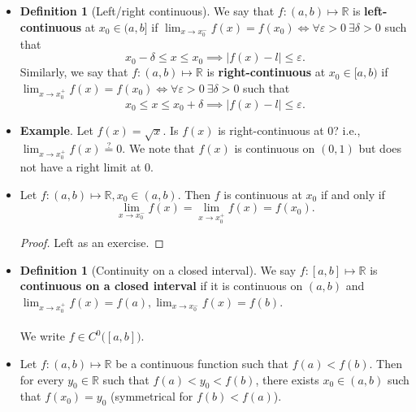 \documentclass{article}
\newcommand{\R}{\mathbb{R}}
\newcommand{\?}{\stackrel{?}{=}}
\theoremstyle{definition} %
\newtheorem{definition}[theorem]{Definition} %
\begin{document}
\begin{itemize}
\begin{definition}[Left/right limits]
              We write $\lim_{x \to x_0^+} f(x) = x_0$.
          \end{definition}
    \item[]
          \begin{definition}[Left/right continuous]
              We say that $f: (a, b) \mapsto \R$ is \textbf{left-continuous} at $x_0 \in (a, b]$ if $\lim_{x \to x_0^-} f(x) = f(x_0) \iff \forall \varepsilon > 0 \ \exists \delta > 0$ such that
              $$x_0 - \delta \leq x \leq x_0 \implies |f(x) - l| \leq \varepsilon.$$
              Similarly, we say that $f: (a, b) \mapsto \R$ is \textbf{right-continuous} at $x_0 \in [a, b)$ if $\lim_{x \to x_0^+} f(x) = f(x_0) \iff \forall \varepsilon > 0 \ \exists \delta > 0$ such that
              $$x_0 \leq x \leq x_0 + \delta \implies |f(x) - l| \leq \varepsilon.$$
          \end{definition}
    \item \textbf{Example}. Let $f(x) = \sqrt{x}$. Is $f(x)$ is right-continuous at 0? i.e., $\lim_{x \to x_0^+} f(x) \overset{?}{=} 0$. We note that $f(x)$ is continuous on $(0, 1)$ but does not have a right limit at 0.
    \item[]
          \begin{lemma}
              Let $f: (a, b) \mapsto \R, x_0 \in (a, b)$. Then $f$ is continuous at $x_0$ if and only if
              $$\lim_{x \to x_0^-} f(x) = \lim_{x \to x_0^+} f(x) = f(x_0).$$
          \end{lemma}
          \begin{proof}
              Left as an exercise.
          \end{proof}
    \item[]
          \begin{definition}[Continuity on a closed interval]
              We say $f: [a, b] \mapsto \R$ is \textbf{continuous on a closed interval} if it is continuous on $(a, b)$ and $\lim_{x \to x_0^+} f(x) = f(a), \lim_{x \to x_0^-} f(x) = f(b)$. \\\\
              We write $f \in C^0\big([a, b]\big)$.
          \end{definition}
    \item[]
          \begin{theorem}
              Let $f: (a, b) \mapsto \R$ be a continuous function such that $f(a) < f(b)$. Then for every $y_0 \in \R$ such that $f(a) < y_0 < f(b)$, there exists $x_0 \in (a, b)$ such that $f(x_0) = y_0$ (symmetrical for $f(b) < f(a)$). \\\\

\end{theorem}
\end{itemize}
\end{document}
